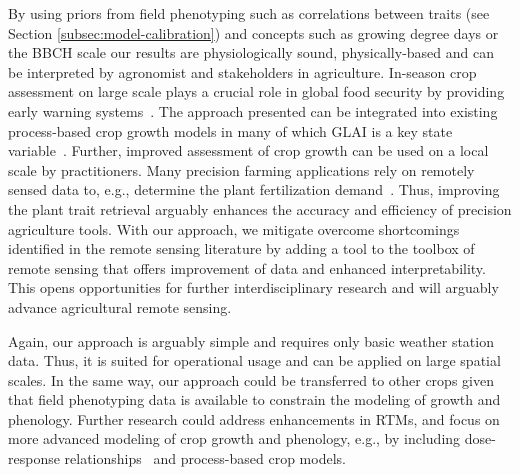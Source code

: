 By using priors from field phenotyping such as correlations between traits (see Section \ref{subsec:model-calibration}) and concepts such as growing degree days or the BBCH scale our results are physiologically sound, physically-based and can be interpreted by agronomist and stakeholders in agriculture. In-season crop assessment on large scale plays a crucial role in global food security by providing early warning systems~\citep{becker-reshef_strengthening_2020}. The approach presented can be integrated into existing process-based crop growth models in many of which \gls{GLAI} is a key state variable~\citep{delecolle_remote_1992}. Further, improved assessment of crop growth can be used on a local scale by practitioners. Many precision farming applications rely on remotely sensed data to, e.g., determine the plant fertilization demand~\citep{argento_site-specific_2021,argento_investigating_2022}. Thus, improving the plant trait retrieval arguably enhances the accuracy and efficiency of precision agriculture tools. With our approach, we mitigate overcome shortcomings identified in the remote sensing literature by adding a tool to the toolbox of remote sensing that offers improvement of data and enhanced interpretability. This opens opportunities for further interdisciplinary research and will arguably advance agricultural remote sensing. 

Again, our approach is arguably simple and requires only basic weather station data. Thus, it is suited for operational usage and can be applied on large spatial scales. In the same way, our approach could be transferred to other crops given that field phenotyping data is available to constrain the modeling of growth and phenology. Further research could address enhancements in RTMs, and focus on more advanced modeling of crop growth and phenology, e.g., by including dose-response relationships~\citep{roth_phenomics_2021,roth_phenomics_2022} and process-based crop models.

